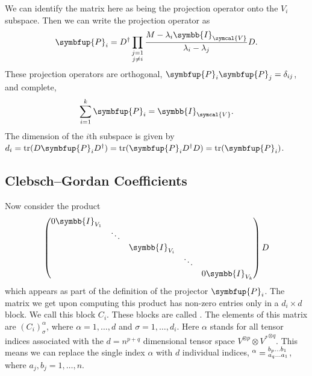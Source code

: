 \documentclass[fleqn]{NotesClass}
\newcommand{\identityMatrix}{\symbb{I}}
\newcommand{\hermit}{\dagger}
\newcommand{\projector}[1]{\symbfup{P}_{#1}}
\newcommand{\dual}[1]{{#1^{*}}}
\DeclareMathOperator{\tr}{tr}
\begin{document}
    We can identify the matrix here as being the projection operator onto the \(V_i\) subspace.
    Then we can write the projection operator as
    \begin{equation}
        \projector{i} = D^\hermit \prod_{\substack{j=1\\ j\ne i}} \frac{M - \lambda_i\identityMatrix_{\symcal{V}}}{\lambda_i - \lambda_j} D.
    \end{equation}
    These projection operators are orthogonal, \(\projector{i}\projector{j} = \delta_{ij}\), and complete,
    \begin{equation}
        \sum_{i=1}^{k} \projector{i} = \identityMatrix_{\symcal{V}}.
    \end{equation}
    The dimension of the \(i\)th subspace is given by \(d_i = \tr(D \projector{i} D^\hermit) = \tr(\projector{i}D^\hermit D) =\tr(\projector{i})\).
    
    \subsection{Clebsch--Gordan Coefficients}
    Now consider the product
    \begin{equation}
        \begin{pmatrix}
            0\identityMatrix_{V_1} \\
            & \ddots \\
            && \identityMatrix_{V_i} \\
            &&& \ddots \\
            &&&& 0\identityMatrix_{V_k}
        \end{pmatrix}
        D
    \end{equation}
    which appears as part of the definition of the projector \(\projector{i}\).
    The matrix we get upon computing this product has non-zero entries only in a \(d_i \times d\) block.
    We call this block \(C_i\).
    These blocks are called .
    The elements of this matrix are \((C_i)_\sigma^\alpha\), where \(\alpha = 1, \dotsc, d\) and \(\sigma = 1, \dotsc, d_i\).
    Here \(\alpha\) stands for all tensor indices associated with the \(d = n^{p + q}\) dimensional tensor space \(V^{\otimes p} \otimes \dual{V}^{\otimes q}\).
    This means we can replace the single index \(\alpha\) with \(d\) individual indices, \(\tensor{\mathstrut}{^\alpha} = \tensor*{\mathstrut}{^{b_p \dotso b_1}_{a_q\dotso a_1}}\), where \(a_j, b_j = 1, \dotsc, n\).
    
\end{document}
